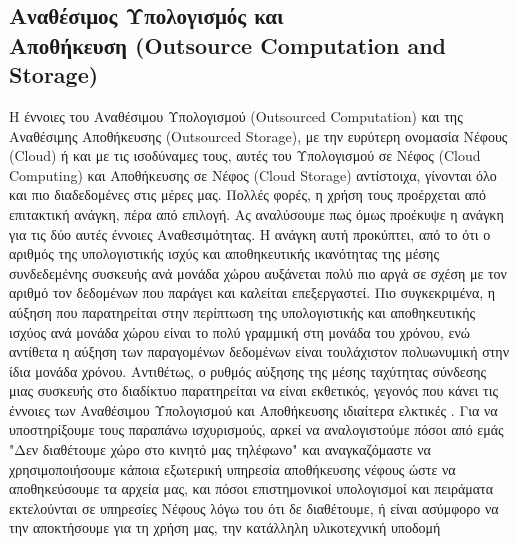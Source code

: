 \subsection[Αναθέσιμος Υπολογισμός και Αποθήκευση (Outsource Computation and Storage)]{Αναθέσιμος Υπολογισμός και \\ Αποθήκευση (Outsource Computation and Storage)}
Η έννοιες του Αναθέσιμου Υπολογισμού (Outsourced Computation) και της Αναθέσιμης Αποθήκευσης (Outsourced Storage), με την ευρύτερη ονομασία Νέφους (Cloud) ή και με τις ισοδύναμες τους, αυτές του Υπολογισμού σε Νέφος (Cloud Computing) και Αποθήκευσης σε Νέφος (Cloud Storage) αντίστοιχα, γίνονται όλο και πιο διαδεδομένες στις μέρες μας. Πολλές φορές, η χρήση τους προέρχεται από επιτακτική ανάγκη, πέρα από επιλογή. Ας αναλύσουμε πως όμως προέκυψε η ανάγκη για τις δύο αυτές έννοιες Αναθεσιμότητας. Η ανάγκη αυτή προκύπτει, από το ότι ο αριθμός της υπολογιστικής ισχύς και αποθηκευτικής ικανότητας της μέσης συνδεδεμένης συσκευής ανά μονάδα χώρου αυξάνεται πολύ πιο αργά σε σχέση με τον αριθμό τον δεδομένων που παράγει και καλείται επεξεργαστεί. Πιο συγκεκριμένα, η αύξηση που παρατηρείται στην περίπτωση της υπολογιστικής και αποθηκευτικής ισχύος ανά μονάδα χώρου είναι το πολύ γραμμική στη μονάδα του χρόνου, ενώ αντίθετα η αύξηση των παραγομένων δεδομένων είναι τουλάχιστον πολυωνυμική στην ίδια μονάδα χρόνου. Αντιθέτως, ο ρυθμός αύξησης της μέσης ταχύτητας σύνδεσης μιας συσκευής στο διαδίκτυο παρατηρείται να είναι εκθετικός, γεγονός που κάνει τις έννοιες των Αναθέσιμου Υπολογισμού και Αποθήκευσης ιδιαίτερα ελκτικές \cite{aljabre2012cloud} \cite{golightly2022adoption} \cite{chen2016perceived}. Για να υποστηρίξουμε τους παραπάνω ισχυρισμούς, αρκεί να αναλογιστούμε πόσοι από εμάς "Δεν διαθέτουμε χώρο στο κινητό μας τηλέφωνο" και αναγκαζόμαστε να χρησιμοποιήσουμε κάποια εξωτερική υπηρεσία αποθήκευσης νέφους ώστε να αποθηκεύσουμε τα αρχεία μας, και πόσοι επιστημονικοί υπολογισμοί και πειράματα εκτελούνται σε υπηρεσίες Νέφους λόγω του ότι δε διαθέτουμε, ή είναι ασύμφορο να την αποκτήσουμε για τη χρήση μας, την κατάλληλη υλικοτεχνική υποδομή

